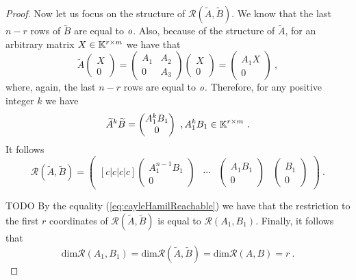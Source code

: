 \begin{proof}
	Now let us focus on the structure of $\mathcal{R}(\widetilde{A},\widetilde{B})$. We know that the last $n-r$ rows of $\widetilde{B}$ are equal to $\textit{o}$. Also, because of the structure of $\widetilde{A}$, for an arbitrary matrix $X\in\mathbb{K}^{r\times m}$ we have that 
	\begin{equation*}
		\widetilde{A}
		\begin{pmatrix}
			X \\
			0
		\end{pmatrix}
		=
		\begin{pmatrix}
			A_1 & A_2 \\
			  0 & A_3
		\end{pmatrix}
		\begin{pmatrix}
			X \\
			0
		\end{pmatrix}
		=
		\begin{pmatrix}
			A_1X \\
			0
		\end{pmatrix}\ ,
	\end{equation*}
	where, again, the last $n-r$ rows are equal to $\textit{o}$. Therefore, for any positive integer $k$ we have 
	\begin{equation*}
		\widetilde{A}^k\widetilde{B}=
		\begin{pmatrix}
			A_1^{k}B_1 \\
			0
        \end{pmatrix}
        \ ,A_1^kB_1\in\mathbb{K}^{r\times m}\ .
    \end{equation*}
    It follows
    \begin{equation*}
        \mathcal{R}(\widetilde{A},\widetilde{B})=
        \begin{pmatrix}[c|c|c|c]
            \begin{pmatrix}
                A_1^{n-1}B_1 \\
                0 
            \end{pmatrix}
            & \cdots &
            \begin{pmatrix}
                A_1B_1 \\
                0 
            \end{pmatrix}
            &
            \begin{pmatrix}
                B_1 \\
                0 
            \end{pmatrix}
        \end{pmatrix}\ .
    \end{equation*}
	
	TODO By the equality (\ref{eq:cayleHamilReachable}) we have that the restriction to the first $r$ coordinates of $\mathcal{R}(\widetilde{A},\widetilde{B})$ is equal to $\mathcal{R}(A_1,B_1)$. Finally, it follows that
	$$\text{dim}\mathcal{R}(A_1,B_1)=\text{dim}\mathcal{R}(\widetilde{A},\widetilde{B})=\text{dim}\mathcal{R}(A,B)=r\ .$$
\end{proof}

